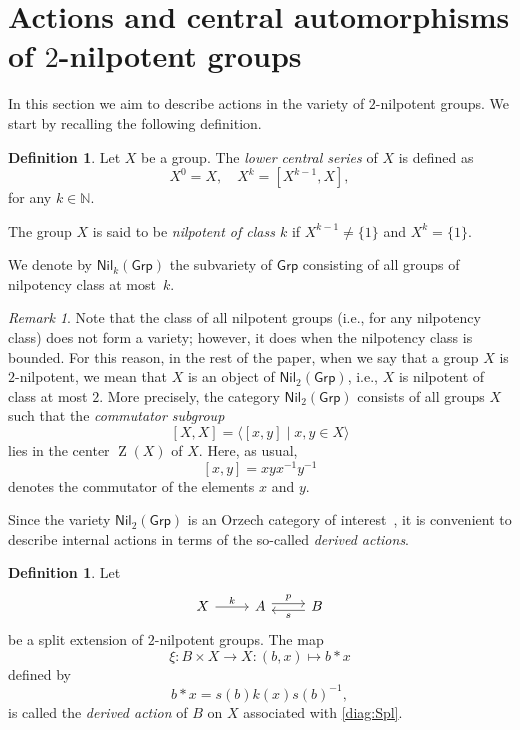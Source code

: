 \documentclass[reqno,hidelinks,a4paper]{amsart}
\theoremstyle{plain}
\theoremstyle{definition}
\newtheorem{definition}[subsection]{Definition}
\theoremstyle{remark}
\newtheorem{remark}[subsection]{Remark}
\numberwithin{equation}{section}
\DeclareMathOperator{\bZ}{Z}
\newcommand{\Grp}{\ensuremath{\mathsf{Grp}}}
\newcommand{\Nil}{\ensuremath{\mathsf{Nil}}}
\begin{document}
\section{Actions and central automorphisms of \texorpdfstring{\(2\)}{2}-nilpotent groups}\label{sec_act}

In this section we aim to describe actions in the variety of \(2\)-nilpotent groups. We start by recalling the following definition.

\begin{definition}
    Let \(X\) be a group. The \emph{lower central series} of \(X\) is defined as
    \[
        X^{0}=X, \quad X^{k}=[X^{k-1},X],
    \]
    for any \(k \in \mathbb{N}\).

    The group \(X\) is said to be \emph{nilpotent of class \(k\)} if \(X^{k-1}\neq \{1\}\) and \(X^{k}=\{1\}\).
\end{definition}

We denote by \(\Nil_k(\Grp)\) the subvariety of \(\Grp\) consisting of all groups of nilpotency class at most~\(k\).

\begin{remark}
    Note that the class of all nilpotent groups (i.e., for any nilpotency class) does not form a variety; however, it does when the nilpotency class is bounded. For this reason, in the rest of the paper, when we say that a group \(X\) is \(2\)-nilpotent, we mean that \(X\) is an object of \(\Nil_2(\Grp)\), i.e., \(X\) is nilpotent of class at most \(2\). More precisely, the category \(\Nil_2(\Grp)\) consists of all groups \(X\) such that the \emph{commutator subgroup}
    \[
        [X,X]=\langle [x,y] \mid x,y \in X \rangle
    \]
    lies in the center \(\bZ(X)\) of \(X\). Here, as usual,
    \[
        [x,y]=xyx^{-1}y^{-1}
    \]
    denotes the commutator of the elements \(x\) and \(y\).
\end{remark}

Since the variety \(\Nil_2(\Grp)\) is an Orzech category of interest~\cite{Orzech}, it is convenient to describe internal actions in terms of the so-called \emph{derived actions}.

\begin{definition}
    Let
    \begin{equation}\label{diag:Spl}
        \begin{tikzcd}
            X\arrow [r, "k"]
            &A \arrow[r, shift left, "p"] &
            B\ar[l, shift left, "s"]
        \end{tikzcd}
    \end{equation}
    be a split extension of \(2\)-nilpotent groups. The map
    \[
        \xi \colon B \times X \to X \colon (b,x) \mapsto b \ast x
    \]
    defined by
    \[
        b \ast x = s(b)k(x)s(b)^{-1},
    \]
    is called the \emph{derived action} of \(B\) on \(X\) associated with \eqref{diag:Spl}.
\end{definition}
\end{document}
